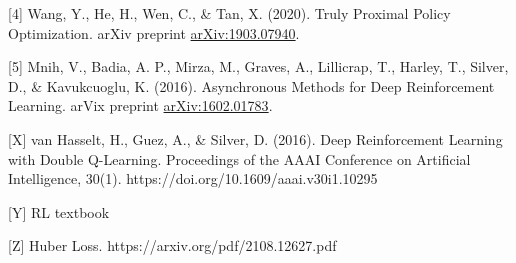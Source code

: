 \documentclass{article}
\begin{document}
    [4] Wang, Y., He, H., Wen, C., \& Tan, X. (2020). Truly Proximal Policy Optimization. arXiv preprint \href{https://arxiv.org/abs/1903.07940}{arXiv:1903.07940}.
    
    [5] Mnih, V., Badia, A. P., Mirza, M., Graves, A., Lillicrap, T., Harley, T., Silver, D., & Kavukcuoglu, K. (2016). Asynchronous Methods for Deep Reinforcement Learning. arVix preprint \href{https://arxiv.org/abs/1602.01783}{arXiv:1602.01783}.

    [X] van Hasselt, H., Guez, A., & Silver, D. (2016). Deep Reinforcement Learning with Double Q-Learning. Proceedings of the AAAI Conference on Artificial Intelligence, 30(1). https://doi.org/10.1609/aaai.v30i1.10295

    [Y] RL textbook

    [Z] Huber Loss. https://arxiv.org/pdf/2108.12627.pdf 

    
\end{document}
